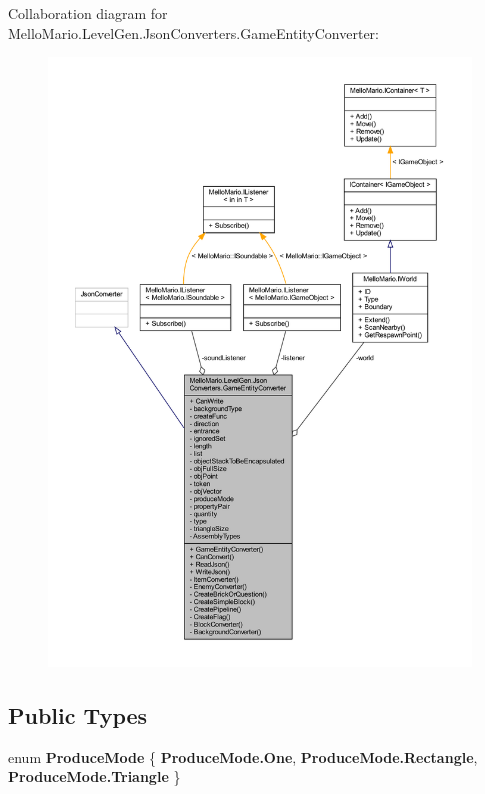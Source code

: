 Collaboration diagram for Mello\+Mario.\+Level\+Gen.\+Json\+Converters.\+Game\+Entity\+Converter\+:
\nopagebreak
\begin{figure}[H]
\begin{center}
\leavevmode
\includegraphics[width=350pt]{classMelloMario_1_1LevelGen_1_1JsonConverters_1_1GameEntityConverter__coll__graph}
\end{center}
\end{figure}
\subsection*{Public Types}
\begin{DoxyCompactItemize}
\item 
enum \textbf{ Produce\+Mode} \{ \textbf{ Produce\+Mode.\+One}, 
\textbf{ Produce\+Mode.\+Rectangle}, 
\textbf{ Produce\+Mode.\+Triangle}
 \}
\end{DoxyCompactItemize}

